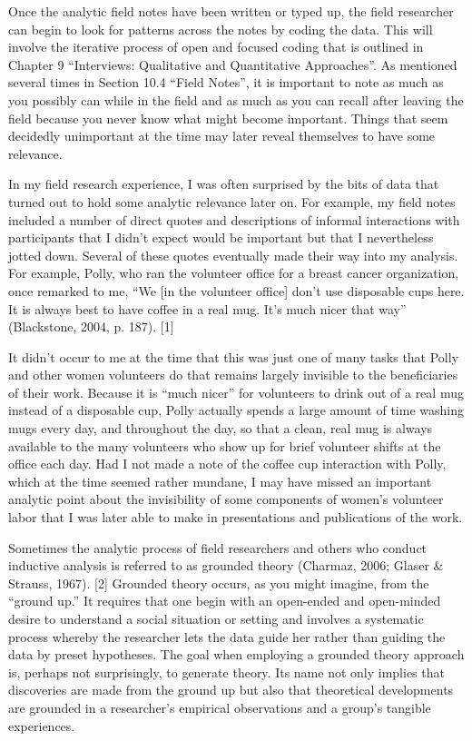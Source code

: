 Once the analytic field notes have been written or typed up, the field researcher can begin to look for patterns across the notes by coding the data. This will involve the iterative process of open and focused coding that is outlined in Chapter 9 ``Interviews: Qualitative and Quantitative Approaches''. As mentioned several times in Section 10.4 ``Field Notes'', it is important to note as much as you possibly can while in the field and as much as you can recall after leaving the field because you never know what might become important. Things that seem decidedly unimportant at the time may later reveal themselves to have some relevance.

In my field research experience, I was often surprised by the bits of data that turned out to hold some analytic relevance later on. For example, my field notes included a number of direct quotes and descriptions of informal interactions with participants that I didn’t expect would be important but that I nevertheless jotted down. Several of these quotes eventually made their way into my analysis. For example, Polly, who ran the volunteer office for a breast cancer organization, once remarked to me, ``We [in the volunteer office] don’t use disposable cups here. It is always best to have coffee in a real mug. It’s much nicer that way'' (Blackstone, 2004, p. 187). [1]

It didn’t occur to me at the time that this was just one of many tasks that Polly and other women volunteers do that remains largely invisible to the beneficiaries of their work. Because it is ``much nicer'' for volunteers to drink out of a real mug instead of a disposable cup, Polly actually spends a large amount of time washing mugs every day, and throughout the day, so that a clean, real mug is always available to the many volunteers who show up for brief volunteer shifts at the office each day. Had I not made a note of the coffee cup interaction with Polly, which at the time seemed rather mundane, I may have missed an important analytic point about the invisibility of some components of women’s volunteer labor that I was later able to make in presentations and publications of the work.

Sometimes the analytic process of field researchers and others who conduct inductive analysis is referred to as grounded theory (Charmaz, 2006; Glaser \& Strauss, 1967). [2] Grounded theory occurs, as you might imagine, from the ``ground up.'' It requires that one begin with an open-ended and open-minded desire to understand a social situation or setting and involves a systematic process whereby the researcher lets the data guide her rather than guiding the data by preset hypotheses. The goal when employing a grounded theory approach is, perhaps not surprisingly, to generate theory. Its name not only implies that discoveries are made from the ground up but also that theoretical developments are grounded in a researcher’s empirical observations and a group’s tangible experiences.

